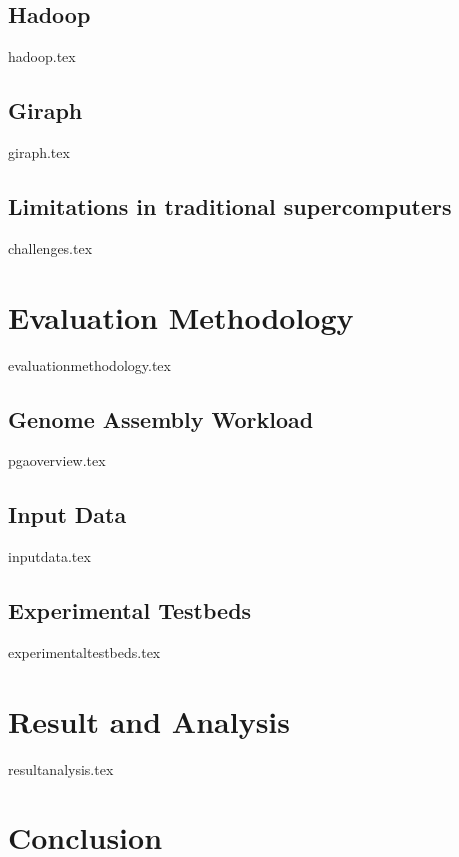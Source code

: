 \documentclass[conference]{IEEEtran}
\begin{document}
\subsection {Hadoop}
 {hadoop.tex}
\subsection {Giraph}
 {giraph.tex}
\subsection {Limitations in traditional supercomputers}
 {challenges.tex}


\section {Evaluation Methodology} \label{Evaluation Methodology}
 {evaluationmethodology.tex}
\subsection {Genome Assembly Workload}
 {pgaoverview.tex}
\subsection {Input Data}
 {inputdata.tex}
\subsection {Experimental Testbeds}
 {experimentaltestbeds.tex}

\section {Result and Analysis} \label{Result and Analysis}
 {resultanalysis.tex}

\section {Conclusion}





\end{document}
